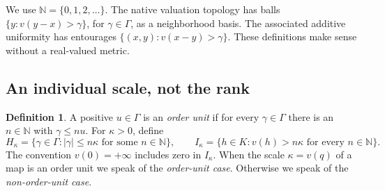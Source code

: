 \documentclass[11pt,a4paper]{article}
\numberwithin{equation}{section}
\theoremstyle{plain}
\theoremstyle{definition}
\newtheorem{definition}[definition]{Definition}
\theoremstyle{remark}
\newcommand{\N}{\mathbb N}
\newcommand{\Ik}{I_\kappa}
\begin{document}
We use $\N=\{0,1,2,\ldots\}$. The native valuation topology has balls
$\{y:v(y-x)>\gamma\}$, for $\gamma\in\Gamma$, as a neighborhood basis.
The associated additive uniformity has entourages
$\{(x,y):v(x-y)>\gamma\}$. These definitions make sense without a
real-valued metric.

\subsection{An individual scale, not the rank}
\begin{definition}\label{epd:def:orderunit}
A positive $u\in\Gamma$ is an \emph{order unit} if for every
$\gamma\in\Gamma$ there is an
$n\in\N$ with $\gamma\leq nu$. For $\kappa>0$, define
\[
 H_\kappa=\{\gamma\in\Gamma:|\gamma|\leq n\kappa
                    \text{ for some }n\in\N\},\qquad
 \Ik=\{h\in K:v(h)>n\kappa\text{ for every }n\in\N\}.
\]
The convention $v(0)=+\infty$ includes zero in $\Ik$.
When the scale $\kappa=v(q)$ of a map is an order unit we speak of the
\emph{order-unit case}. Otherwise we speak of the \emph{non-order-unit
case}.
\end{definition}
\end{document}
